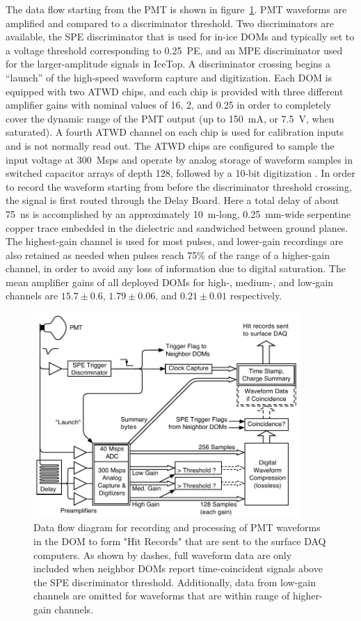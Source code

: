 The data flow starting from the PMT is shown in figure~\ref{fig:domdataflow}.
PMT waveforms are amplified and compared to a discriminator threshold.  Two
discriminators are available, the SPE discriminator that is used for in-ice DOMs
and typically set to a voltage threshold corresponding to \qty{0.25}{PE},
and an MPE discriminator used for the larger-amplitude signals in IceTop.
A discriminator crossing begins a ``launch'' of the high-speed waveform
capture and digitization. Each DOM is equipped with two ATWD chips,
and each chip is provided with three different amplifier
gains with nominal values of 16, 2, and 0.25 in order to completely cover the 
dynamic range of the PMT output (up to 150~mA, or 7.5~V, when saturated).  A
fourth ATWD channel on each chip is used for calibration inputs and is not normally read out.
The ATWD chips are configured to sample the input voltage at \qty{300}{Msps}
and operate by analog storage of waveform samples in switched capacitor arrays of depth 128,
followed by a 10-bit digitization \cite{atwd}.  In order to record the waveform starting from before the discriminator
threshold crossing, the signal is first routed through the Delay Board.  Here a total delay of about
\qty{75}{ns} is accomplished by an approximately \qty{10}{m}-long, \qty{0.25}{mm}-wide
serpentine copper trace embedded in the dielectric and sandwiched between
ground planes.  The highest-gain channel is used
for most pulses, and lower-gain recordings are also retained as needed when pulses reach 75\% of the range 
of a higher-gain channel, in order to avoid any loss of information due to
digital saturation.  The mean amplifier gains of all deployed DOMs for high-,
medium-, and low-gain channels are $15.7\pm0.6$, $1.79\pm0.06$, and $0.21\pm0.01$ respectively.

\begin{figure}[h]
 \centering
 \includegraphics[width=0.9\textwidth]{graphics/dom/functional/domfig3-DOMDataFlow.pdf}
 \caption{Data flow diagram for recording and processing of PMT waveforms in the DOM to form 
 "Hit Records" that are sent to the surface DAQ computers.  As shown by dashes, full waveform data are only included
 when neighbor DOMs report time-coincident signals above the SPE discriminator threshold.  Additionally,
 data from low-gain channels are omitted for waveforms that are within range of higher-gain channels.}
 \label{fig:domdataflow}
\end{figure}

